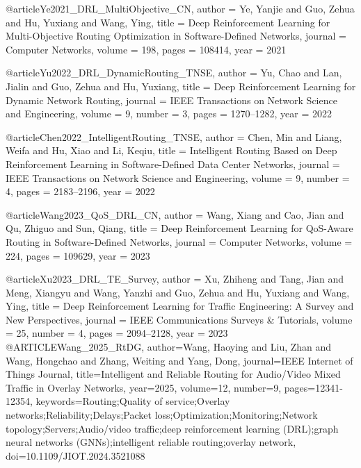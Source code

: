 @article{Ye2021_DRL_MultiObjective_CN,
    author  = {Ye, Yanjie and Guo, Zehua and Hu, Yuxiang and Wang, Ying},
    title   = {Deep Reinforcement Learning for Multi-Objective Routing Optimization in Software-Defined Networks},
    journal = {Computer Networks},
    volume  = {198},
    pages   = {108414},
    year    = {2021}
}

@article{Yu2022_DRL_DynamicRouting_TNSE,
    author  = {Yu, Chao and Lan, Jialin and Guo, Zehua and Hu, Yuxiang},
    title   = {Deep Reinforcement Learning for Dynamic Network Routing},
    journal = {IEEE Transactions on Network Science and Engineering},
    volume  = {9},
    number  = {3},
    pages   = {1270--1282},
    year    = {2022}
}

@article{Chen2022_IntelligentRouting_TNSE,
    author  = {Chen, Min and Liang, Weifa and Hu, Xiao and Li, Keqiu},
    title   = {Intelligent Routing Based on Deep Reinforcement Learning in Software-Defined Data Center Networks},
    journal = {IEEE Transactions on Network Science and Engineering},
    volume  = {9},
    number  = {4},
    pages   = {2183--2196},
    year    = {2022}
}

@article{Wang2023_QoS_DRL_CN,
    author  = {Wang, Xiang and Cao, Jian and Qu, Zhiguo and Sun, Qiang},
    title   = {Deep Reinforcement Learning for {QoS}-Aware Routing in Software-Defined Networks},
    journal = {Computer Networks},
    volume  = {224},
    pages   = {109629},
    year    = {2023}
}

@article{Xu2023_DRL_TE_Survey,
    author  = {Xu, Zhiheng and Tang, Jian and Meng, Xiangyu and Wang, Yanzhi and Guo, Zehua and Hu, Yuxiang and Wang, Ying},
    title   = {Deep Reinforcement Learning for Traffic Engineering: {A} Survey and New Perspectives},
    journal = {IEEE Communications Surveys \& Tutorials},
    volume  = {25},
    number  = {4},
    pages   = {2094--2128},
    year    = {2023}
}
@ARTICLE{Wang_2025_RtDG,
  author={Wang, Haoying and Liu, Zhan and Wang, Hongchao and Zhang, Weiting and Yang, Dong},
  journal={IEEE Internet of Things Journal}, 
  title={{Intelligent and Reliable Routing for Audio/Video Mixed Traffic in Overlay Networks}}, 
  year={2025},
  volume={12},
  number={9},
  pages={12341-12354},
  keywords={Routing;Quality of service;Overlay networks;Reliability;Delays;Packet loss;Optimization;Monitoring;Network topology;Servers;Audio/video traffic;deep reinforcement learning (DRL);graph neural networks (GNNs);intelligent reliable routing;overlay network},
  doi={10.1109/JIOT.2024.3521088}}


